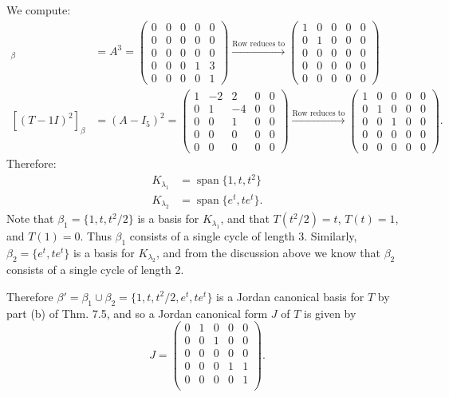 \documentclass[12pt]{article}
\DeclareMathOperator{\spn}{span}
\begin{document}
\begin{enumerate}
\begin{enumerate}
We compute:
\begin{align*}
[(T-0I)^3]_\beta &= A^3 = \begin{pmatrix}
0 & 0 & 0 & 0 & 0 \\
0 & 0 & 0 & 0 & 0 \\
0 & 0 & 0 & 0 & 0 \\
0 & 0 & 0 & 1 & 3 \\
0 & 0 & 0 & 0 & 1
\end{pmatrix}
\xrightarrow{\text{Row reduces to}}
\begin{pmatrix}
1 & 0 & 0 & 0 & 0 \\
0 & 1 & 0 & 0 & 0 \\
0 & 0 & 0 & 0 & 0 \\
0 & 0 & 0 & 0 & 0 \\
0 & 0 & 0 & 0 & 0
\end{pmatrix} \\
[(T-1I)^2]_\beta &= (A-I_5)^2 = \begin{pmatrix}
1 & -2 & 2 & 0 & 0 \\
0 & 1 & -4 & 0 & 0 \\
0 & 0 & 1 & 0 & 0 \\
0 & 0 & 0 & 0 & 0 \\
0 & 0 & 0 & 0 & 0
\end{pmatrix}
\xrightarrow{\text{Row reduces to}}
\begin{pmatrix}
1 & 0 & 0 & 0 & 0 \\
0 & 1 & 0 & 0 & 0 \\
0 & 0 & 1 & 0 & 0 \\
0 & 0 & 0 & 0 & 0 \\
0 & 0 & 0 & 0 & 0
\end{pmatrix}.
\end{align*}
Therefore:
\begin{align*}
K_{\lambda_1} &= \spn\{1, t, t^2\} \\
K_{\lambda_2} &= \spn\{e^t, te^t\}.
\end{align*}
Note that $\beta_1 = \{1, t, t^2/2\}$ is a basis for $K_{\lambda_1}$, and that $T(t^2/2) = t$, $T(t) = 1$, and $T(1) = 0$. Thus $\beta_1$ consists of a single cycle of length 3. Similarly, $\beta_2 = \{e^t, te^t\}$ is a basis for $K_{\lambda_2}$, and from the discussion above we know that $\beta_2$ consists of a single cycle of length 2.

Therefore $\beta' = \beta_1 \cup \beta_2 = \{1, t, t^2/2, e^t, te^t\}$ is a Jordan canonical basis for $T$ by part (b) of Thm. 7.5, and so a Jordan canonical form $J$ of $T$ is given by
\begin{equation*}
J = \begin{pmatrix}
0 & 1 & 0 & 0 & 0 \\
0 & 0 & 1 & 0 & 0 \\
0 & 0 & 0 & 0 & 0 \\
0 & 0 & 0 & 1 & 1 \\
0 & 0 & 0 & 0 & 1 \\
\end{pmatrix}.
\end{equation*}


\end{enumerate}
\end{enumerate}
\end{document}
